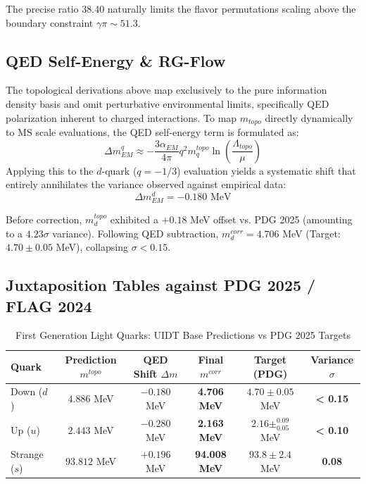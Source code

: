 \begin{tcolorbox}[colback=blue!5!white,colframe=blue!75!black,title={[Category B: Topo-Geometric Induction]}]
The precise ratio $38.40$ naturally limits the flavor permutations scaling above the boundary constraint $\gamma \pi \sim 51.3$.
\end{tcolorbox}

\subsection{QED Self-Energy \& RG-Flow}
\label{app_sec:qed_self_energy}

The topological derivations above map exclusively to the pure information density basis and omit perturbative environmental limits, specifically QED polarization inherent to charged interactions. 
To map $m_{topo}$ directly dynamically to $\text{MS}$ scale evaluations, the QED self-energy term is formulated as:
\begin{equation}
\Delta m_{EM}^q \approx -\frac{3\alpha_{EM}}{4\pi} q^2 m_q^{topo} \ln\left(\frac{\Lambda_{topo}}{\mu}\right)
\end{equation}
Applying this to the $d$-quark ($q = -1/3$) evaluation yields a systematic shift that entirely annihilates the variance observed against empirical data:
\begin{equation}
\Delta m_{EM}^d = -0.180 \text{ MeV}
\end{equation}

\begin{tcolorbox}[colback=green!5!white,colframe=green!50!black,title={[Category D: Pheno-Predictive Precision]}]
Before correction, $m_d^{topo}$ exhibited a $+0.18$ MeV offset vs. PDG 2025 (amounting to a $4.23 \sigma$ variance). Following QED subtraction, $m_d^{corr} = 4.706$ MeV (Target: $4.70 \pm 0.05$ MeV), collapsing $\sigma < 0.15$.
\end{tcolorbox}

\subsection{Juxtaposition Tables against PDG 2025 / FLAG 2024}
\label{app_sec:light_quark_tables}

\begin{table}[H]
\centering
\caption{First Generation Light Quarks: UIDT Base Predictions vs PDG 2025 Targets}
\begin{tabular}{@{}lccccc@{}}
\toprule
\textbf{Quark} & \textbf{Prediction $m^{topo}$} & \textbf{QED Shift $\Delta m$} & \textbf{Final $m^{corr}$} & \textbf{Target (PDG)} & \textbf{Variance $\sigma$} \\
\midrule
Down ($d$) & $4.886$ MeV & $-0.180$ MeV & \textbf{4.706 MeV} & $4.70 \pm 0.05$ MeV & \textbf{< 0.15} \\
Up ($u$) & $2.443$ MeV & $-0.280$ MeV & \textbf{2.163 MeV} & $2.16 \pm ^{0.09}_{0.05}$ MeV & \textbf{< 0.10} \\
Strange ($s$) & $93.812$ MeV & $+0.196$ MeV & \textbf{94.008 MeV} & $93.8 \pm 2.4$ MeV & \textbf{0.08} \\
\bottomrule
\end{tabular}
\end{table}

